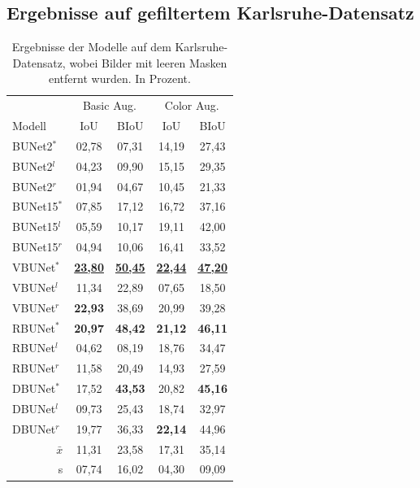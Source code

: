 \pagebreak

\subsection{Ergebnisse auf gefiltertem Karlsruhe-Datensatz}

\begin{table}[ht]
	\centering
	\begin{tabular}{l|cc|cc}
		& \multicolumn{2}{c|}{Basic Aug.} & \multicolumn{2}{c}{Color Aug.} \\ 
		Modell & \ac{IoU} & \ac{BIoU}  & \ac{IoU} & \ac{BIoU}  \\
		\toprule
        BUNet2$^*$ & 02,78 & 07,31  &  14,19 & 27,43 \\
        BUNet2$^l$ & 04,23 & 09,90  &  15,15 & 29,35 \\
        BUNet2$^r$ & 01,94 & 04,67  &  10,45 & 21,33 \\
		\midrule

        BUNet15$^*$ & 07,85 & 17,12  &  16,72 & 37,16 \\
        BUNet15$^l$ & 05,59 & 10,17  &  19,11 & 42,00 \\
        BUNet15$^r$ & 04,94 & 10,06  &  16,41 & 33,52 \\
		\midrule

        VBUNet$^*$ & \underline{\textbf{23,80}} & \underline{\textbf{50,45}} &  \underline{\textbf{22,44}} & \underline{\textbf{47,20}} \\
        VBUNet$^l$ & 11,34 & 22,89 &  07,65 & 18,50 \\
        VBUNet$^r$ & \textbf{22,93} & 38,69 &  20,99 & 39,28 \\
		\midrule

        RBUNet$^*$ & \textbf{20,97} & \textbf{48,42} &  \textbf{21,12} & \textbf{46,11} \\
        RBUNet$^l$ & 04,62 & 08,19 &  18,76 & 34,47 \\
        RBUNet$^r$ & 11,58 & 20,49 &  14,93 & 27,59 \\
		\midrule

        DBUNet$^*$ & 17,52 & \textbf{43,53} &  20,82 & \textbf{45,16} \\
        DBUNet$^l$ & 09,73 & 25,43 &  18,74 & 32,97 \\
        DBUNet$^r$ & 19,77 & 36,33 &  \textbf{22,14} & 44,96 \\

		\bottomrule
		\multicolumn{1}{r|}{$\bar{x}$}  & 11,31 &	23,58 &	17,31 &	35,14 \\
		\midrule
		\multicolumn{1}{r|}{s} & 07,74	& 16,02	& 04,30 &	09,09 \\

        
	\end{tabular}
	\caption{Ergebnisse der Modelle auf dem Karlsruhe-Datensatz, wobei Bilder mit leeren Masken entfernt wurden. 
    In Prozent.}
	\label{tab:results-ka-small}
\end{table}

